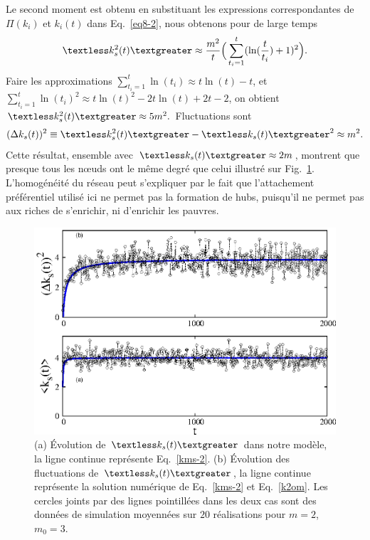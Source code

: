 Le second moment est obtenu en substituant les expressions correspondantes de $\Pi(k_i)$ et $k_i(t)$ dans Eq.~\ref {eq8-2}, nous obtenons pour de large temps
 \begin{eqnarray}
\begin{split}
\kmss\approx \frac{m^2}{t}\Big(\sum_{t_i=1}^t (\ln(\frac{t}{t_i})+1)^2\Big).
\label{k2om}
\end{split}
\end{eqnarray}
Faire les approximations  $\sum_{t_i=1}^t \ln(t_i)\approx t\ln(t)-t$, et
$\sum_{t_i=1}^t \ln(t_i)^2\approx t\ln(t)^2-2t\ln(t)+2t-2$, on obtient $\kmss\approx 5m^2.$ Fluctuations sont 
\begin{eqnarray}
 (\Delta k_s(t))^2 \equiv {\kmss-\kms^2}\approx m^2.
\end{eqnarray}
 Cette résultat, ensemble avec $\kms\approx 2m $, montrent que presque tous les nœuds ont le même degré que celui illustré sur Fig.~\ref{fig2b-2}. L'homogénéité du réseau peut s'expliquer par le fait que l'attachement préférentiel utilisé ici ne permet pas la formation de hubs, puisqu'il ne permet pas aux riches de s'enrichir, ni d'enrichir les pauvres. 
\begin{figure}[h]
	\centering
	\includegraphics[scale=1]{./figures/nfig3}
	\caption{(a) Évolution de $\kms$ dans notre modèle, la ligne continue représente Eq.~\ref{kms-2}.
	(b) Évolution des fluctuations de $\kms$, la ligne continue représente la solution numérique de Eq.~\ref{kms-2} et Eq.~\ref{k2om}. Les cercles joints par des lignes pointillées dans les deux cas sont des données de simulation moyennées sur $20$ réalisations pour $m=2$, $m_0=3$.}
	\label{fig2b-2}
\end{figure}
 \vspace{4cm}
